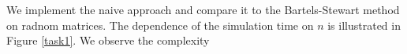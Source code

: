 We implement the naive approach and compare it to the Bartels-Stewart method on radnom matrices. The dependence of the simulation time on $n$ is illustrated in Figure \ref{task1}. We observe the complexity

